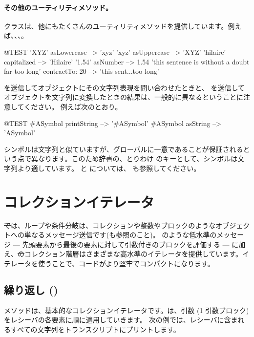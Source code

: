 \documentclass[a4paper,10pt,twoside]{book}
\begin{document}
\paragraph{その他のユーティリティメソッド。}
 クラスは、他にもたくさんのユーティリティメソッドを提供しています。例えば、、、。

\begin{code}{@TEST}
'XYZ' asLowercase --> 'xyz'
'xyz' asUppercase   --> 'XYZ'
'hilaire' capitalized   --> 'Hilaire'
'1.54' asNumber      --> 1.54
'this sentence is without a doubt far too long' contractTo: 20 --> 'this sent...too long'
\end{code}

 を送信してオブジェクトにその文字列表現を問い合わせたときと、 を送信してオブジェクトを文字列に変換したときの結果は、一般的に異なるということに注意してください。
例えば次のとおり。

\begin{code}{@TEST}
#ASymbol printString --> '#ASymbol'
#ASymbol asString    --> 'ASymbol'
\end{code}

シンボルは文字列と似ていますが、グローバルに一意であることが保証されるという点で異なります。このため辞書の、とりわけ  のキーとして、シンボルは文字列より適しています。
 と  については、 も参照してください。

\section{コレクションイテレータ}

\st では、ループや条件分岐は、コレクションや整数やブロックのようなオブジェクトへの単なるメッセージ送信です(も参照のこと)。 のような低水準のメッセージ --- 先頭要素から最後の要素に対して引数付きのブロックを評価する --- に加え、\st のコレクション階層はさまざまな高水準のイテレータを提供しています。イテレータを使うことで、コードがより堅牢でコンパクトになります。

\subsection{繰り返し ()}
 メソッドは、基本的なコレクションイテレータです。は、引数 (1 引数ブロック)をレシーバの各要素に順に適用していきます。
次の例では、レシーバに含まれるすべての文字列をトランスクリプトにプリントします。
\end{document}
